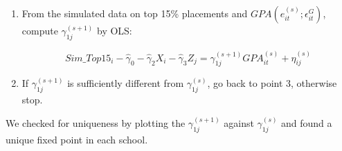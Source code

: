 \begin{enumerate}[leftmargin=5.5mm]
	\item From the simulated data on top 15\% placements and $GPA(e_{it}^{(s)};\epsilon_{it}^G)$, compute $\gamma_{1j}^{(s+1)}$ by OLS:

    \begin{equation*} 
    Sim\_Top15_i-\hat{\gamma}_0-\hat{\gamma}_2X_i-\hat{\gamma}_3Z_j=\gamma_{1j}^{(s+1)} GPA_{it}^{(s)} +\eta_{ij}^{(s)}
    \end{equation*}

	\item If $\gamma_{1j}^{(s+1)}$ is sufficiently different from $\gamma_{1j}^{(s)}$, go back to point 3, otherwise stop.
	
\end{enumerate}
We checked for uniqueness by plotting the $\gamma_{1j}^{(s+1)}$ against $\gamma_{1j}^{(s)}$ and found a unique fixed point in each school.



	